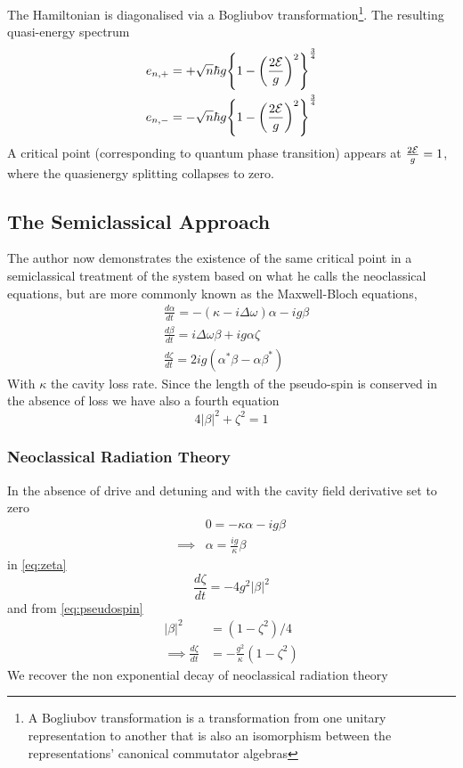 The Hamiltonian is diagonalised via a Bogliubov transformation\footnote{A Bogliubov transformation is a transformation from one unitary representation to another that is also an isomorphism between the representations' canonical commutator algebras}. The resulting quasi-energy spectrum
\begin{align}
  e_{n, +} &= + \sqrt{n} \hbar g {\left \{1 - {\left ({\frac{2\mathcal{E}}{g}} \right )}^2 \right \}}^{\frac{3}{4}} \\
  e_{n, -} &= - \sqrt{n} \hbar g {\left \{1 - {\left ({\frac{2\mathcal{E}}{g}} \right )}^2 \right \}}^{\frac{3}{4}}
\end{align}
A critical point (corresponding to quantum phase transition) appears at $\frac{2\mathcal{E}}{g} = 1$, where the quasienergy splitting collapses to zero.
\subsection{The Semiclassical Approach}

The author now demonstrates the existence of the same critical point in a semiclassical treatment of the system based on what he calls the neoclassical equations, but are more commonly known as the Maxwell-Bloch equations,
\begin{align}
  &\frac{d \alpha}{dt} = -(\kappa -i \Delta \omega) \alpha-ig \beta \label{eq:alpha}\\
  &\frac{d \beta}{dt} = i \Delta \omega \beta +ig \alpha \zeta \label{eq:beta}\\
  &\frac{d \zeta}{dt} = 2 i g(\alpha^* \beta -\alpha \beta^*)\label{eq:zeta}
\end{align}
With $\kappa$ the cavity loss rate. Since the length of the pseudo-spin is conserved in the absence of loss we have also a fourth equation
\begin{equation}
  4|\beta|^2+\zeta^2 = 1 \label{eq:pseudospin}
\end{equation}
\subsubsection{Neoclassical Radiation Theory}
In the absence of drive and detuning and with the cavity field derivative set to zero
\begin{align}
  & 0 = -\kappa \alpha - ig \beta \\
  \implies & \alpha = \frac{ig}{\kappa} \beta
\end{align}
in \cref{eq:zeta}
\begin{equation}
  \frac{d \zeta}{dt} = -4 g^2 |\beta|^2
\end{equation}
and from \cref{eq:pseudospin}
\begin{align}
   |\beta|^2 &= (1-\zeta^2)/4 \\
\implies \frac{d \zeta}{dt} &= -\frac{g^2}{\kappa} (1-\zeta^2)
\end{align}
We recover the non exponential decay of neoclassical radiation theory
